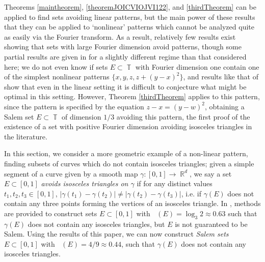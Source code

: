 \documentclass[dvipsnames,letterpaper,12pt]{article}
\numberwithin{equation}{section}
\DeclareMathOperator{\hausdim}{\dim_{\mathbb{H}}}
\DeclareMathOperator{\fordim}{\dim_{\mathbb{F}}}
\DeclareMathOperator{\RR}{\mathbb{R}}
\DeclareMathOperator{\TT}{\mathbb{T}}
\numberwithin{theorem}{section}
\begin{document}
Theorems \ref{maintheorem}, \ref{theoremJOICVIOJVI122}, and \ref{thirdTheorem} can be applied to find sets avoiding linear patterns, but the main power of these results that they can be applied to `nonlinear' patterns which cannot be analyzed quite as easily via the Fourier transform. As a result, relatively few results exist showing that sets with large Fourier dimension avoid patterns, though some partial results are given in \cite{HenriotLabaPramanik} for a slightly different regime than that considered here; we do not even know if sets $E \subset \TT$ with Fourier dimension one contain one of the simplest nonlinear patterns $\{ x, y, z, z + (y - x)^2 \}$, and results like that of \cite{Schmerkin} show that even in the linear setting it is difficult to conjecture what might be optimal in this setting. However, Theorem \ref{thirdTheorem} applies to this pattern, since the pattern is specified by the equation $z - x = (y - w)^2$, obtaining a Salem set $E \subset \TT$ of dimension $1/3$ avoiding this pattern, the first proof of the existence of a set with positive Fourier dimension avoiding isosceles triangles in the literature.

In this section, we consider a more geometric example of a non-linear pattern, finding subsets of curves which do not contain isosceles triangles; given a simple segment of a curve given by a smooth map $\gamma : [0,1] \to \RR^d$, we say a set $E \subset [0,1]$ \emph{avoids isosceles triangles on $\gamma$} if for any distinct values $t_1,t_2,t_3 \in [0,1]$, $|\gamma(t_1) - \gamma(t_2)| \neq |\gamma(t_2) - \gamma(t_3)|$, i.e. if $\gamma(E)$ does not contain any three points forming the vertices of an  isosceles triangle. In \cite{PramanikFraser}, methods are provided to construct sets $E \subset [0,1]$ with $\hausdim(E) = \log_3 2 \approx 0.63$ such that $\gamma(E)$ does not contain any isosceles triangles, but $E$ is not guaranteed to be Salem. Using the results of this paper, we can now construct \emph{Salem sets} $E \subset [0,1]$ with $\fordim(E) = 4/9 \approx 0.44$, such that $\gamma(E)$ does not contain any isosceles triangles.
\end{document}

